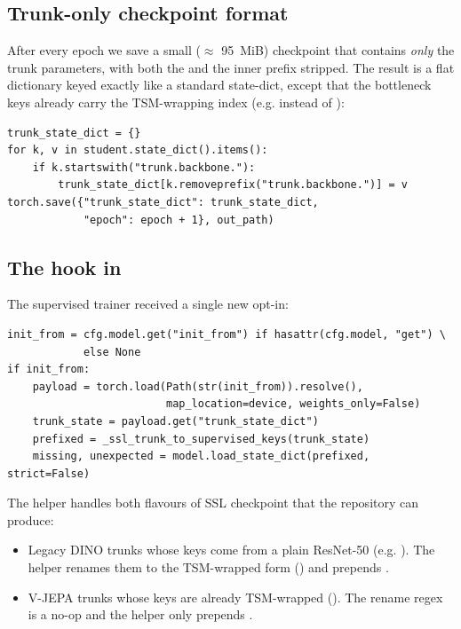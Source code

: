 \subsection{Trunk-only checkpoint format}

After every epoch we save a small ($\approx$ 95~MiB) checkpoint that
contains \emph{only} the trunk parameters, with both the 
and the inner  prefix stripped. The result is a flat
dictionary keyed exactly like a standard
 state-dict, except that the
bottleneck  keys already carry the TSM-wrapping index (e.g.
 instead of
):

\begin{lstlisting}[style=py]
trunk_state_dict = {}
for k, v in student.state_dict().items():
    if k.startswith("trunk.backbone."):
        trunk_state_dict[k.removeprefix("trunk.backbone.")] = v
torch.save({"trunk_state_dict": trunk_state_dict,
            "epoch": epoch + 1}, out_path)
\end{lstlisting}

\subsection{The  hook in }
\label{sec:phase3:initfrom}

The supervised trainer received a single new opt-in:

\begin{lstlisting}[style=py]
init_from = cfg.model.get("init_from") if hasattr(cfg.model, "get") \
            else None
if init_from:
    payload = torch.load(Path(str(init_from)).resolve(),
                         map_location=device, weights_only=False)
    trunk_state = payload.get("trunk_state_dict")
    prefixed = _ssl_trunk_to_supervised_keys(trunk_state)
    missing, unexpected = model.load_state_dict(prefixed, strict=False)
\end{lstlisting}

The helper  handles both
flavours of SSL checkpoint that the repository can produce:

\begin{itemize}[leftmargin=2em]
\item Legacy DINO trunks whose keys come from a plain
    ResNet-50 (e.g. ).
   The helper renames them to the TSM-wrapped form
   () and prepends .
\item V-JEPA trunks whose keys are already TSM-wrapped
   (). The rename regex is a no-op and
   the helper only prepends \code{backbone.}.
\end{itemize}

